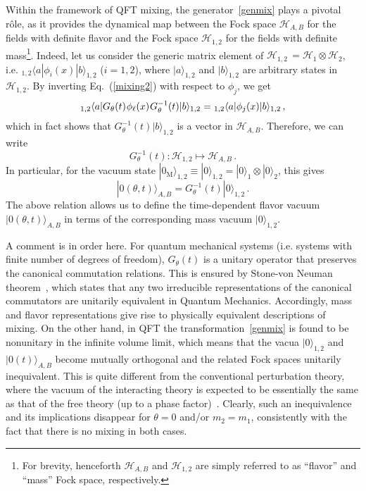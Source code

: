 \documentclass[floats,prd,aps,amssymb,nofootinbib,showkeys]{revtex4}
\newcommand{\be}{\begin{equation}}\newcommand{\ee}{\end{equation}}
\begin{document}
Within the framework of QFT mixing, the generator~\eqref{genmix}
plays a pivotal r\^ole, 
as it provides the dynamical map between
the Fock space $\mathcal{H}_{A,B}$ for the fields 
with definite flavor and the Fock space
$\mathcal{H}_{1,2}$ for the fields with definite mass\footnote{For brevity, henceforth $\mathcal{H}_{A,B}$ and $\mathcal{H}_{1,2}$ are simply referred to as ``flavor'' and ``mass'' Fock space, respectively.}.
Indeed, let us consider 
the generic matrix element of $\mathcal{H}_{1,2}\,=\mathcal{H}_1\otimes\mathcal{H}_2$, i.e. $_{1,2}\langle a|\phi_{i}(x)|b\rangle_{1,2}$ ($i=1,2$), 
where $|a \rangle_{1,2}$ and $|b \rangle_{1,2}$  
are arbitrary states in ${\mathcal H}_{1,2}$. 
By inverting Eq.~(\ref{mixing2}) with respect to $\phi_j$, 
we get
\begin{equation}
_{1,2}\langle a|G_{\theta}(t)\hspace{0.2mm}
\phi_\ell(x)\hspace{0.2mm}G^{-1}_{\theta}(t)|b \rangle_{1,2}=\hspace{0.1mm}_{1,2}\langle a|\phi_{j}(x)|b \rangle_{1,2}\,,
\label{eqn:inversequation}
\end{equation}
which in fact shows that $G_{\theta}^{-1}(t)|b \rangle_{1,2}$ 
is a vector in $\mathcal{H}_{A,B}$. 
Therefore, we can write
\begin{equation}
G^{-1}_{\theta}(t): {\mathcal H}_{1,2} \mapsto {\mathcal H}_{A,B}\,.
\label{mapp}
\end{equation}
In particular, for the vacuum state
$|0_\mathrm{M}\rangle_{1,2}\equiv|0\rangle_{1,2}=|0\rangle_{1}\otimes|0\rangle_{2}$, this gives
\be
|0(\theta,t) \rangle_{A,B} = G^{-1}_{\theta}(t)|0 \rangle_{1,2}\,.  
\label{flavvacu}
\ee
The above relation allows us to define
the time-dependent flavor vacuum  
$|0(\theta,t) \rangle_{A,B}$ 
in terms of the corresponding mass vacuum $|0\rangle_{1,2}$. 

A comment is in order here. For quantum mechanical systems 
(i.e. systems with finite number of degrees of freedom),  
$G_{\theta}(t)$ is a unitary operator that preserves 
the canonical commutation relations. This is ensured
by Stone-von Neuman theorem~\cite{SvN,Stone}, 
which states that any two irreducible representations of the canonical commutators are unitarily equivalent in Quantum Mechanics.
Accordingly, mass and flavor representations
give rise to physically equivalent
descriptions of mixing. On the other hand,  
in QFT the transformation~\eqref{genmix} 
is found to be nonunitary in the infinite volume limit, which
means that the vacua $|0\rangle_{1,2}$ 
and $|0(t)\rangle_{A,B}$ become mutually
orthogonal and the related Fock spaces
unitarily inequivalent. This is quite
different from the conventional perturbation theory, 
where the vacuum of the interacting theory is
expected to be essentially the same as that of 
the free theory (up to a phase
factor)~\cite{BogoCit}. Clearly, such an inequivalence and its implications
disappear for $\theta=0$ and/or $m_2=m_1$, consistently with
the fact that there is no mixing in both cases.
\end{document}
